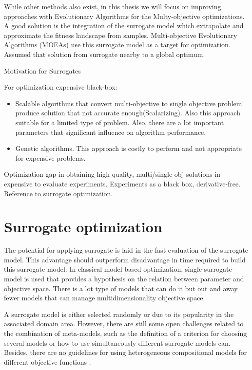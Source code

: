             While other methods also exist, in this thesis we will focus on improving approaches with Evolutionary Algorithms for the Multy-objective optimizations. A good solution is the integration of the surrogate model which extrapolate and approximate the fitness landscape from samples. Multi-objective Evolutionary Algorithms (MOEAs) use this surrogate model as a target for optimization. Assumed that solution from surrogate nearby to a global optimum.

            Motivation for Surrogates

            For optimization expensive black-box:
            \begin{itemize}
                \item Scalable algorithms that convert multi-objective to single objective problem produce solution that not accurate enough(Scalarizing). Also this approach suitable for a limited type of problem. Also, there are a lot important parameters that significant influence on algorithm performance.
                \item Genetic algorithms. This approach is costly to perform and not appropriate for expensive problems.
            \end{itemize}
            Optimization gap in obtaining high quality, multi/single-obj solutions in expensive to evaluate experiments.
            Experiments as a black box, derivative-free. Reference to surrogate optimization.


    \section{Surrogate optimization} 

        The potential for applying surrogate is laid in the fast evaluation of the surrogate model. This advantage should outperform disadvantage in time required to build this surrogate model. In classical model-based optimization, single surrogate-model is used that provides a hypothesis on the relation between parameter and objective space. There is a lot type of models that can do it but out and away fewer models that can manage multidimensionality objective space.

        A surrogate model is either selected randomly or due to its popularity in the associated domain area.  However, there are still some open challenges related to the combination of meta-models, such as the definition of a criterion for choosing several models or how to use simultaneously different surrogate models can. Besides, there are no guidelines for using heterogeneous compositional models for different objective functions \cite{SoftSurvey}.

